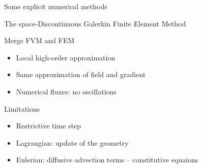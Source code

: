 \begin{withoutheadline}
  \begin{frame}{Some explicit numerical methods}
    \begin{block}{The space-Discontinuous Galerkin Finite Element Method \cite{Cockburn}}
      \begin{footnotesize}
        \begin{block}{\footnotesize Merge FVM and FEM}
          \vspace{-.2cm}
          \begin{itemize}
          \item[] Local high-order approximation \cite{NeutronDG}
          \item[] Same approximation of field and gradient
          \item[] Numerical fluxes: no oscillations
          \end{itemize}
        \end{block}
        \vspace{-.2cm}
        \begin{block}{\footnotesize Limitations}
          \vspace{-.2cm}
          \begin{itemize}
          \item[] Restrictive time step
          \item[] Lagrangian: update of the geometry \cite{LagrangianDG_thesis}
          \item[] Eulerian: diffusive advection terms -- constitutive equaions
          \end{itemize}
        \end{block}
      \end{footnotesize}
    \end{block}
  \end{frame}
\end{withoutheadline}


